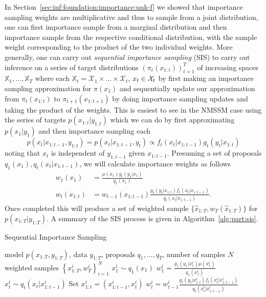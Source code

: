 In Section~\ref{sec:inf:foundation:importance:unk-f} we showed that importance sampling weights
are multiplicative and thus to sample from a joint
distribution, one can first importance sample from a marginal distribution and then importance
sample from the respective conditional distribution, with the sample weight corresponding to the
product of the two individual weights.  More generally, one can carry out \emph{sequential importance
	sampling} (SIS) to carry out inference on a series of target distributions $(\pi_t(x_{1:t}))_{t = 1}^T$ of 
increasing spaces $\mathbb{X}_1,\dots,\mathbb{X}_T$ where each
$\mathbb{X}_t = \mathcal{X}_1 \times \dots \times \mathcal{X}_t$, $x_t\in\mathcal{X}_t$ by first making
an importance sampling approximation for $\pi(x_1)$ and sequentially update our approximation from
$\pi_t(x_{1:t})$ to $\pi_{t+1}(x_{1:t+1})$ by doing importance sampling updates and taking the product of
the weights.  This is easiest to see in the NMSSM case using the series of targets $p(x_{1:t}|y_{1:t})$
which we can do by first approximating $p(x_1 | y_1)$ and then importance sampling each 
\[
p (x_t | x_{1:t-1}, y_{1:t})=p(x_t | x_{1:t-1}, y_t)\propto f_{t}(x_t | x_{1:t-1}) g_{t}(y_t | x_{1:t})
\]
noting that $x_t$ is independent of $y_{1:t-1}$ given $x_{1:t-1}$.  
Presuming a set of proposals 
$q_1(x_1), q_t(x_t | x_{1:t-1})$, we will calculate importance weights as follows
\begin{subequations}
	\label{eq:part:sis-weights}
\begin{align}
w_1 (x_1) &= \frac{\mu (x_1)g_{t}(y_1 | x_1)}{q_1(x_1)} \\
w_t (x_{1:t}) &= w_{t-1} (x_{1:t-1}) \frac{g_{t}(y_t|x_{1:t}) f_{t}(x_t | x_{1:t-1})}{q_t(x_t|x_{1:t-1})}.
\end{align}
\end{subequations}
Once completed this will produce a set of weighted sample $\{\hat{x}_{1:T},w_T(\hat{x}_{1:T})\}$ for 
$p(x_{1:T} | y_{1:T})$.  A summary of the SIS process is given in Algorithm~\ref{alg:part:sis}.

\begin{algorithm}[tb]
	\caption{Sequential Importance Sampling}
	\label{alg:part:sis}
	\begin{spacing}{1.2}
		\begin{algorithmic}[1]
			\renewcommand{\algorithmicrequire}{\textbf{Inputs:}}
			\renewcommand{\algorithmicensure}{\textbf{Outputs:}}			 
			\Require model $p(x_{1:T},y_{1:T})$, data $y_{1:T}$, proposals $q_1,\dots,q_T$, number of samples $N$
			\Ensure weighted samples $\left\{x_{1:T}^i,w_T^i\right\}_{i=1}^N$
			\State $x_1^i \sim q_1(x_1)$
			\State $w_1^i = \frac{g_1(y_1|x_1^i) \mu(x_1^i)}{q_1(x_1^i)}$
			\State $x_t^i \sim q_t(x_t | x_{1:t-1}^i)$ 
			\State Set $x_{1:t}^i = (x_{1:t-1}^{i},x_t^i)$
			\State $w_t^i = w_{t-1}^i \frac{g_t(y_t|x_{1:t}^i) f_t(x_t^i | x_{1:t-1}^{i})}{q_t(x_t^i|x_{1:t-1}^{i})}$
			\EndFor
			\EndFor
		\end{algorithmic}
	\end{spacing}
\end{algorithm}

